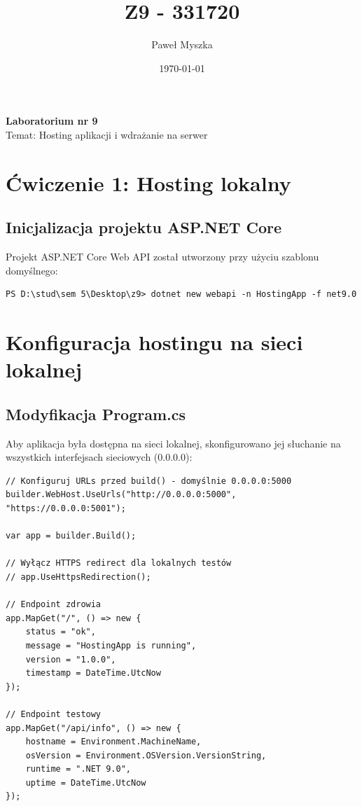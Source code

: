 \documentclass[twoside]{article}
\title{Z9 - 331720}
\author{Paweł Myszka}
\date{\today}
\begin{document}
	
	\pagestyle{fancy}
	\fancyhead{}
	\fancyhead[L]{\@title}
	\fancyhead[R]{\@author}
	\fancyhead[C]{\@date}
	
	\cfoot{\thepage\ / \pageref{LastPage}}
	
	\newpage
	\begin{center}
		{\Huge \textbf{Laboratorium nr 9}}\\[0.5cm]
		{\Large Temat: Hosting aplikacji i wdrażanie na serwer}
	\end{center}
	
	\newpage

\section{Ćwiczenie 1: Hosting lokalny}

\subsection{Inicjalizacja projektu ASP.NET Core}

Projekt ASP.NET Core Web API został utworzony przy użyciu szablonu domyślnego:

\begin{verbatim}
PS D:\stud\sem 5\Desktop\z9> dotnet new webapi -n HostingApp -f net9.0

\end{verbatim}

\section{Konfiguracja hostingu na sieci lokalnej}

\subsection{Modyfikacja Program.cs}

Aby aplikacja była dostępna na sieci lokalnej, skonfigurowano jej słuchanie na wszystkich interfejsach sieciowych (0.0.0.0):

\begin{lstlisting}
// Konfiguruj URLs przed build() - domyślnie 0.0.0.0:5000
builder.WebHost.UseUrls("http://0.0.0.0:5000", "https://0.0.0.0:5001");

var app = builder.Build();

// Wyłącz HTTPS redirect dla lokalnych testów
// app.UseHttpsRedirection();

// Endpoint zdrowia
app.MapGet("/", () => new { 
    status = "ok", 
    message = "HostingApp is running",
    version = "1.0.0",
    timestamp = DateTime.UtcNow
});

// Endpoint testowy
app.MapGet("/api/info", () => new {
    hostname = Environment.MachineName,
    osVersion = Environment.OSVersion.VersionString,
    runtime = ".NET 9.0",
    uptime = DateTime.UtcNow
});
\end{lstlisting}
\end{document}
